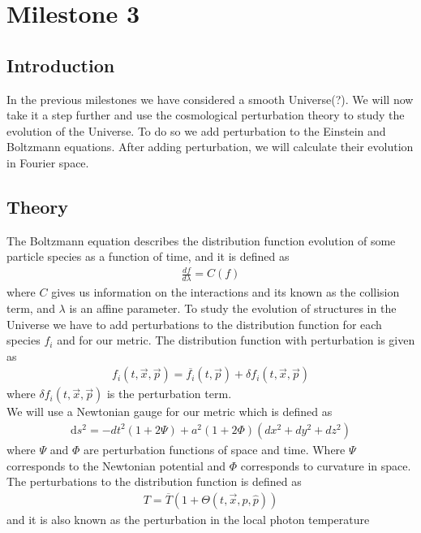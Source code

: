 \documentclass{aa}
\begin{document}
\section{Milestone 3}
\subsection{Introduction}
In the previous milestones we have considered a smooth Universe(?). We will now take it a step further and use the cosmological perturbation theory to study the evolution of the Universe. To do so we add perturbation to the Einstein and Boltzmann equations. After adding perturbation, we will calculate their evolution in Fourier space. 
\subsection{Theory}
The Boltzmann equation describes the distribution function evolution of some particle species as a function of time, and it is defined as
\begin{align}
    \frac{df}{d\lambda} = C(f) \label{eq:BE_C}
\end{align}
where $C$ gives us information on the interactions and its known as the collision term, and $\lambda$ is an affine parameter.   
To study the evolution of structures in the Universe we have to add perturbations to the distribution function for each species $f_i$ and for our metric. The distribution function with perturbation is given as
\begin{align}
    f_i(t,\vec{x},\vec{p}) = \overline{f_i}(t,\vec{p}) + \delta f_i(t,\vec{x},\vec{p}) \label{eq:pert_f_i}
\end{align}
where $\delta f_i(t,\vec{x},\vec{p})$ is the perturbation term. \\
We will use a Newtonian gauge for our metric which is defined as
\begin{align}
    \mathrm{d} s^{2}= -dt^2(1+2\Psi) + a^2(1+2\Phi)(dx^2 + dy^2 + dz^2) \label{eq:NG}
\end{align}
where $\Psi$ and $\Phi$ are perturbation functions of space and time. Where $\Psi$ corresponds to the Newtonian potential and $\Phi$ corresponds to curvature in space. 
\\
The perturbations to the distribution function is defined as
\begin{align*}
    T = \overline{T}(1 + \Theta(t,\vec{x},p,\hat{p}))
\end{align*}
and it is also known as the perturbation in the local photon temperature
\end{document}
